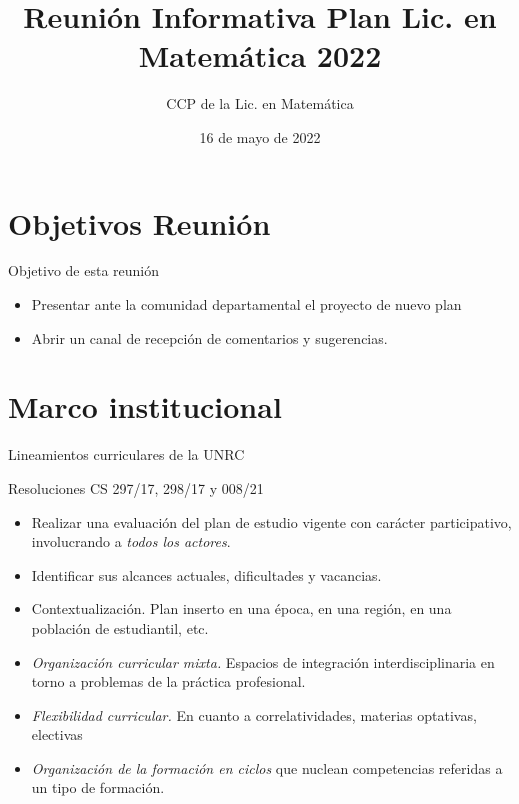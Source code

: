 \documentclass[11pt]{beamer}
\author{CCP de la Lic. en Matemática}
\title{Reunión Informativa Plan Lic. en Matemática 2022}
\date{16 de mayo de 2022}
\begin{document}
\begin{frame}
\titlepage
\end{frame}


\section{Objetivos Reunión}
\begin{frame}{Objetivo de esta reunión}
\begin{block}{}
\begin{itemize}
 
\item<+-> Presentar ante la comunidad departamental el proyecto de nuevo plan
\item<+->  Abrir un canal de recepción de comentarios y sugerencias. 
 \end{itemize}

\end{block}


\end{frame}


\section{Marco institucional}
 
\begin{frame}{Lineamientos curriculares de la UNRC }
\begin{small}

Resoluciones CS 297/17, 298/17 y 008/21
 \onslide<+->
\begin{itemize}

 
\item<+-> Realizar una evaluación del plan de estudio vigente con carácter participativo, involucrando a \textit{todos los actores}.
 \item<+-> Identificar sus alcances actuales,  dificultades y vacancias.
 \item<+-> Contextualización.   Plan inserto en una época, en una región, en una población de estudiantil, etc.
 \item<+-> \textit{Organización curricular mixta.} Espacios de integración interdisciplinaria en torno a problemas de la práctica profesional.
 \item<+-> \textit{Flexibilidad curricular.} En cuanto a correlatividades, materias optativas, electivas
 \item<+-> \textit{Organización de la formación en ciclos}  que nuclean competencias referidas a un tipo de formación.


\end{itemize}
\end{small}
\end{frame}
\end{document}
